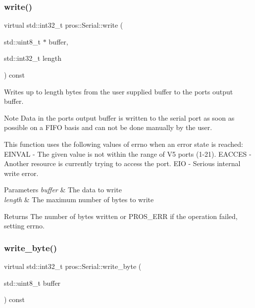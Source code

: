 \subsubsection{\texorpdfstring{write()}{write()}}
{\footnotesize\ttfamily virtual std\+::int32\+\_\+t pros\+::\+Serial\+::write (\begin{DoxyParamCaption}\item[{std\+::uint8\+\_\+t $\ast$}]{buffer,  }\item[{std\+::int32\+\_\+t}]{length }\end{DoxyParamCaption}) const\hspace{0.3cm}{\ttfamily [virtual]}}



Writes up to length bytes from the user supplied buffer to the port\textquotesingle{}s output buffer. 

\begin{DoxyNote}{Note}
Data in the port\textquotesingle{}s output buffer is written to the serial port as soon as possible on a F\+I\+FO basis and can not be done manually by the user.
\end{DoxyNote}
This function uses the following values of errno when an error state is reached\+: E\+I\+N\+V\+AL -\/ The given value is not within the range of V5 ports (1-\/21). E\+A\+C\+C\+ES -\/ Another resource is currently trying to access the port. E\+IO -\/ Serious internal write error.


\begin{DoxyParams}{Parameters}
{\em buffer} & The data to write \\
\hline
{\em length} & The maximum number of bytes to write\\
\hline
\end{DoxyParams}
\begin{DoxyReturn}{Returns}
The number of bytes written or P\+R\+O\+S\+\_\+\+E\+RR if the operation failed, setting errno. 
\end{DoxyReturn}
\mbox{\label{classpros_1_1Serial_a16477199d136d4f2ccbc73281d03965b}} 
\subsubsection{\texorpdfstring{write\+\_\+byte()}{write\_byte()}}
{\footnotesize\ttfamily virtual std\+::int32\+\_\+t pros\+::\+Serial\+::write\+\_\+byte (\begin{DoxyParamCaption}\item[{std\+::uint8\+\_\+t}]{buffer }\end{DoxyParamCaption}) const\hspace{0.3cm}{\ttfamily [virtual]}}



